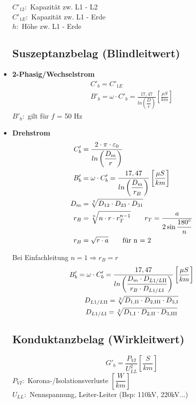 \begin{itemize}
$C'_{12}:$ Kapazität zw. L1 - L2\\
$C'_{1E}:$ Kapazität zw. L1 - Erde\\
$h:$ Höhe zw. L1 - Erde

\subsection{Suszeptanzbelag (Blindleitwert)}
    \item[]{\textbf{2-Phasig/Wechselstrom}}
    \begin{gather*}
        C'_b = C'_{1E}\\
        B'_b = \omega \cdot C'_b = \frac{17,47}{ln\left(\dfrac{D}{r} \right)} \left[ \frac{\mu S}{km} \right]
    \end{gather*}
    $B'_b:$ gilt für $f$ = 50 Hz\\

\item[]{\textbf{Drehstrom}}
    \begin{align*}
        C'_b &= \frac{2\cdot \pi \cdot \varepsilon_0}{ln \left( \dfrac{D_m}{r} \right)} \\
        B'_b &= \omega \cdot C'_b = \frac{17,47}{ln\left(\dfrac{D_m}{r_B} \right)} \left[ \frac{\mu S}{km} \right]\\
        D_{m} &= \sqrt[3]{D_{12} \cdot D_{23} \cdot D_{31}}\\
        r_B &= \sqrt[n]{n \cdot r \cdot r_{T}^{n-1}} \qquad r_T = \frac{a}{2 \sin \dfrac{180 \degree}{n}} \\
        r_B &= \sqrt{r \cdot a} \qquad \textnormal{für n = 2}
    \end{align*}

    Bei Einfachleitung $n=1 \Rightarrow r_B = r$\\

    \begin{gather*}
        B'_b = \omega \cdot C'_b = \frac{17,47}{ln\left(\dfrac{D_m \cdot D_{L1/L\RN{2}}}{r_B \cdot D_{L1/L \RN{1}}} \right)} \left[ \frac{\mu S}{km} \right]\\
        D_{L1/L\RN{2}} = \sqrt[3]{D_{1,\RN{2}} \cdot D_{2,\RN{3}} \cdot D_{3,\RN{1}}}\\
        D_{L1/L\RN{1}} = \sqrt[3]{D_{1,\RN{1}} \cdot D_{2,\RN{2}} \cdot D_{3,\RN{3}}}\\
    \end{gather*}

\subsection{Konduktanzbelag (Wirkleitwert)}
\begin{equation*}
    G'_b = \dfrac{P_{\mathit{VI}}}{U^2_{\mathit{LL}}} \left[\dfrac{S}{km}\right]
\end{equation*}
$P_{\mathit{VI}}:$ Korona-/Isolationsverluste $\left[\dfrac{W}{km} \right]$\\
$U_{\mathit{LL}}:$ Nennspannung, Leiter-Leiter (Bsp: 110kV, 220kV...)
\end{itemize}
